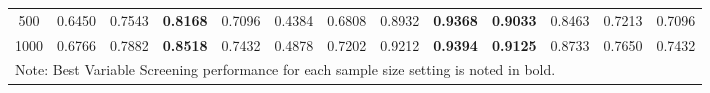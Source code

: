 \documentclass[12pt,a4paper]{article}
\begin{document}
\begin{landscape}
\begin{table}[]
\begin{tabular}{ccccccccccccc}
\multicolumn{1}{|c|}{500}                & 0.6450                  & 0.7543                  & \textbf{0.8168}         & \multicolumn{1}{c|}{0.7096}                  & 0.4384                  & 0.6808                  & 0.8932                  & \multicolumn{1}{c|}{\textbf{0.9368}}         & \textbf{0.9033}         & 0.8463                  & 0.7213                  & \multicolumn{1}{c|}{0.7096}                  \\
\multicolumn{1}{|c|}{1000}               & 0.6766                  & 0.7882                  & \textbf{0.8518}         & \multicolumn{1}{c|}{0.7432}                  & 0.4878                  & 0.7202                  & 0.9212                  & \multicolumn{1}{c|}{\textbf{0.9394}}         & \textbf{0.9125}         & 0.8733                  & 0.7650                  & \multicolumn{1}{c|}{0.7432}                  \\ \hline
\multicolumn{13}{l}{Note: Best Variable Screening performance for each sample size setting is noted in bold.}                                                                                                                                                                                                                                                                                                                  
\end{tabular}
\end{table}


\end{landscape}
\end{document}
